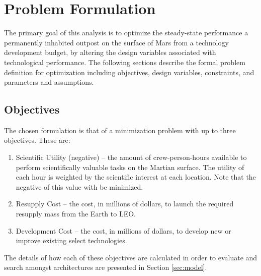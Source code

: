 \documentclass[]{aiaa-pretty}
\begin{document}
\section{Problem Formulation}  
\label{sec:formulation}
The primary goal of this analysis is to optimize the steady-state performance a permanently inhabited outpost on the surface of Mars from a technology development budget, by altering the design variables associated with technological performance. The following sections describe the formal problem definition for optimization including objectives, design variables, constraints, and parameters and assumptions. 
\subsection{Objectives}
The chosen formulation is that of a minimization problem with up to three objectives. These are: 
\begin{enumerate}
\item Scientific Utility (negative) – the amount of crew-person-hours available to perform scientifically valuable tasks on the Martian surface. The utility of each hour is weighted by the scientific interest at each location. Note that the negative of this value with be minimized.
\item Resupply Cost – the cost, in millions of dollars, to launch the required resupply mass from the Earth to LEO.
\item Development Cost – the cost, in millions of dollars, to develop new or improve existing select technologies.
\end{enumerate}
The details of how each of these objectives are calculated in order to evaluate and search amongst architectures are presented in Section \ref{sec:model}. 
\end{document}
